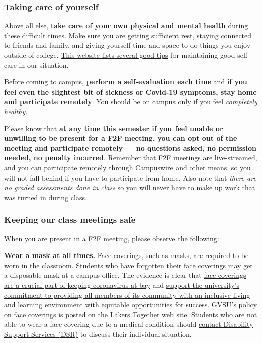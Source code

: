 \documentclass[]{article}
\begin{document}
\hypertarget{taking-care-of-yourself}{%
\subsubsection{Taking care of yourself}\label{taking-care-of-yourself}}

Above all else, \textbf{take care of your own physical and mental
health} during these difficult times. Make sure you are getting
sufficient rest, staying connected to friends and family, and giving
yourself time and space to do things you enjoy outside of college.
\href{https://www.mayoclinichealthsystem.org/hometown-health/speaking-of-health/self-care-tips-during-the-covid-19-pandemic}{This
website lists several good tips} for maintaining good self-care in our
situation.

Before coming to campus, \textbf{perform a self-evaluation each time}
and \textbf{if you feel even the slightest bit of sickness or Covid-19
symptoms, stay home and participate remotely}. You should be on campus
only if you feel \emph{completely healthy}.

Please know that \textbf{at any time this semester if you feel unable or
unwilling to be present for a F2F meeting, you can opt out of the
meeting and participate remotely --- no questions asked, no permission
needed, no penalty incurred}. Remember that F2F meetings are
live-streamed, and you can participate remotely through Campuswire and
other means, so you will not fall behind if you have to participate from
home. Also note that \emph{there are no graded assessments done in
class} so you will never have to make up work that was turned in during
class.

\hypertarget{keeping-our-class-meetings-safe}{%
\subsubsection{Keeping our class meetings
safe}\label{keeping-our-class-meetings-safe}}

When you are present in a F2F meeting, please observe the following:

\textbf{Wear a mask at all times.} Face coverings, such as masks, are
required to be worn in the classroom. Students who have forgotten their
face coverings may get a disposable mask at a campus office. The
evidence is clear that
\href{https://www.wbtv.com/2020/06/29/demonstration-aims-show-effectiveness-masks/}{face
coverings are a crucial part of keeping coronavirus at bay} and
\href{https://www.gvsu.edu/inclusion/suggested-syllabus-language-for-inclusion-and-equity-132.htm}{support
the university's commitment to providing all members of its community
with an inclusive living and learning environment with equitable
opportunities for success}. GVSU's policy on face coverings is posted on
the
\href{https://www.gvsu.edu/lakerstogether/face-covering-policy-27.htm}{Lakers
Together web site}. Students who are not able to wear a face covering
due to a medical condition should
\href{https://www.gvsu.edu/dsr/}{contact Disability Support Services
(DSR)} to discuss their individual situation.
\end{document}
